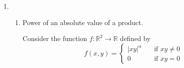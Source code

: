 \documentclass[letterpaper,11pt]{article}
\newcommand{\R}{\mathbb{R}}
\begin{document}
\begin{enumerate}
\begin{enumerate}
\begin{proof}
                    Take an arbitrary convergent sequence $\{x^{(i)}\} \to y$
                    as $i \to \infty$.
                    To show continuity of $f$ at $y$, we must show that
                    $\{|x^{(i)}|_p\} \to |y|_p$ as $i \to \infty$. This
                    deduction follows mainly from the properties of sequences.
                    \begin{align*}
                        \lim_{i\to\infty} \{|x^{(i)}|_p\}
                        &= \lim_{i\to\infty} {
                            \left\{ \sum_{k=1}^n |x_k^{(i)}|^p \right\}
                        } \\
                        &= \sum_{k=1}^n {
                            \lim_{i\to\infty} {
                                \{|x_k^{(i)}|^p\}
                            }
                        } \\
                        &= \sum_{k=1}^n {
                            \lvert
                            \lim_{i\to\infty} \{ x_k^{(i)} \}
                            \rvert
                        }^p \\
                        &= \sum_{k=1}^n {|y_k|^p} \\
                        &= |y|_p
                    \end{align*}

                    The deduction is the same for $1 < p < \infty$, except that
                    we ``push'' the sequence inside the $p$-th root before
                    proceeding the same way.

                    The deduction is also the same for the maximum norm
                    $|\cdot|_\infty$, except that instead of ``pushing'' the
                    sequence inside the sum, we move into into the $\max{}$.
                \end{proof}
        \end{enumerate}

    \item
        \begin{enumerate}
            \item Power of an absolute value of a product.

                Consider the function $f : \R^2 \to \R$ defined by
                \begin{equation*}
                    f(x, y) = \begin{cases}
                        |xy|^\alpha &\quad\text{if } xy \neq 0 \\
                        0           &\quad\text{if } xy = 0
                    \end{cases}
                \end{equation*}


\end{enumerate}
\end{enumerate}
\end{document}
